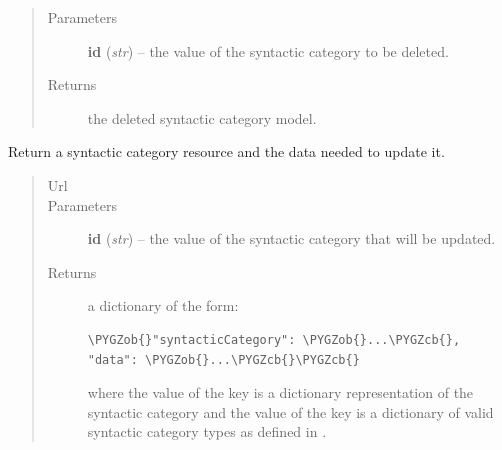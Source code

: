 \documentclass[letterpaper,10pt,english]{sphinxmanual}
\def\PYGZob{\char`\{}
\def\PYGZcb{\char`\}}
\begin{document}
\begin{fulllineitems}
\begin{fulllineitems}
\begin{quote}
\begin{description}
\item[{Parameters}] \leavevmode
\textbf{id} (\emph{str}) -- the  value of the syntactic category to be deleted.

\item[{Returns}] \leavevmode
the deleted syntactic category model.

\end{description}\end{quote}

\end{fulllineitems}


\begin{fulllineitems}
\label{api:onlinelinguisticdatabase.controllers.syntacticcategories.SyntacticcategoriesController.edit}
Return a syntactic category resource and the data needed to update it.
\begin{quote}\begin{description}
\item[{Url }] \leavevmode
{}

\item[{Parameters}] \leavevmode
\textbf{id} (\emph{str}) -- the  value of the syntactic category that will be updated.

\item[{Returns}] \leavevmode

a dictionary of the form:

\begin{Verbatim}[commandchars=\\\{\}]
\PYGZob{}"syntacticCategory": \PYGZob{}...\PYGZcb{}, "data": \PYGZob{}...\PYGZcb{}\PYGZcb{}
\end{Verbatim}

where the value of the  key is a dictionary
representation of the syntactic category and the value of the
 key is a dictionary of valid syntactic category types as
defined in .


\end{description}\end{quote}

\end{fulllineitems}



\end{fulllineitems}
\end{document}
